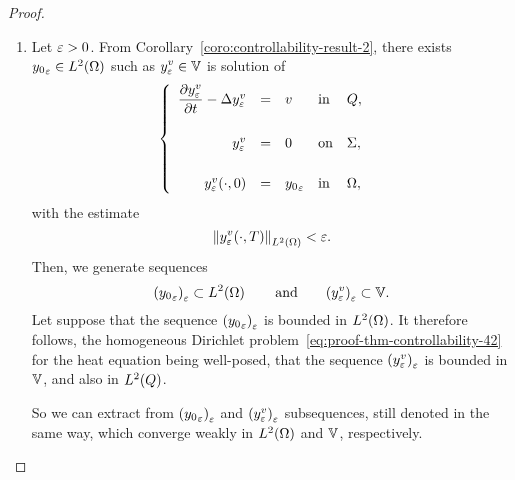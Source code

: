 \begin{proof}%
    \begin{enumerate}
        \item Let $\varepsilon > 0$. From
            Corollary~\ref{coro:controllability-result-2}, there exists
            ${y_{0}}_{\varepsilon}\in L^{2}\!\left({\Omega}\right)$ such as $\displaystyle
            y_{\varepsilon}^{v}\in \mathbb{V}$ is solution of
            \begin{equation}\label{eq:proof-thm-controllability-42}
                \begin{cases}\displaystyle
                    \begin{array}{rclll}
                        \dfrac{\partial{}y_{\varepsilon}^{v}}{\partial{}t} - \Delta y_{\varepsilon}^{v} &
                        = & v & \text{in} & Q,\\
                        \\
                        y_{\varepsilon}^{v} & = & 0 & \text{on} & \Sigma,\\
                        \\
                        y_{\varepsilon}^{v}\!\left({\cdot,0}\right) & = &
                        {y_{0}}_{\varepsilon} & \text{in} & \Omega,
                    \end{array}
                \end{cases}
            \end{equation}
            with the estimate
            \begin{equation*}\label{eq:proof-thm-controllability-43}
                {\left\|{y_{\varepsilon}^{v}\!\left({\cdot, T}\right) }\right\|}_{L^{2}\left({\Omega}\right)} < \varepsilon.
            \end{equation*}
            Then, we generate sequences
            \begin{equation*}
                {\left({{y_{0}}_{\varepsilon}}\right)}_{\varepsilon}\subset
                L^{2}\!\left({\Omega}\right)\qquad\text{and}\qquad
                {\left({y_{\varepsilon}^{v}}\right)}_{\varepsilon}\subset \mathbb{V}.
            \end{equation*}
            Let suppose that the sequence
            ${\left({{y_{0}}_{\varepsilon}}\right)}_{\varepsilon}$ is bounded in
            $L^{2}\!\left({\Omega}\right)$. It therefore follows, the homogeneous
            Dirichlet problem~\eqref{eq:proof-thm-controllability-42} for
            the heat equation being well-posed, that the sequence
            ${\left({y_{\varepsilon}^{v}}\right)}_{\varepsilon}$ is bounded in $\mathbb{V}$,
            and also in $L^{2}\!\left({Q}\right)$.

            So we can extract from
            ${\left({{y_{0}}_{\varepsilon}}\right)}_{\varepsilon}$ and
            ${\left({y_{\varepsilon}^{v}}\right)}_{\varepsilon}$ subsequences, still
            denoted in the same way, which converge weakly in
            $L^{2}\!\left({\Omega}\right)$ and $\mathbb{V}$, respectively.


\end{enumerate}
\end{proof}
